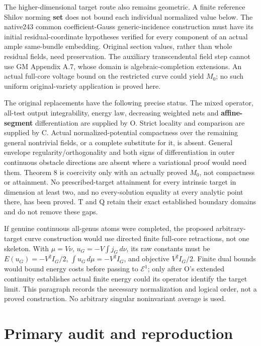 \documentclass[
  11pt,
]{article}
\begin{document}
The higher-dimensional target route also remains geometric. A finite
reference Shilov norming \textbf{set} does not bound each individual
normalized value below. The native243 common coefficient-Gauss
generic-incidence construction must have its initial residual-coordinate
hypotheses verified for every component of an actual ample same-bundle
embedding. Original section values, rather than whole residual fields,
need preservation. The auxiliary transcendental field step cannot use GM
Appendix A.7, whose domain is algebraic-completion extensions. An actual
full-core voltage bound on the restricted curve could yield \(M_0\); no
such uniform original-variety application is proved here.

The original replacements have the following precise status. The mixed
operator, all-test output integrability, energy law, decreasing weighted
nets and \textbf{affine-segment} differentiation are supplied by O.
Strict locality and comparison are supplied by C. Actual
normalized-potential compactness over the remaining general nontrivial
fields, or a complete substitute for it, is absent. General envelope
regularity/orthogonality and both signs of differentiation in outer
continuous obstacle directions are absent where a variational proof
would need them. Theorem 8 is coercivity only with an actually proved
\(M_0\), not compactness or attainment. No prescribed-target attainment
for every intrinsic target in dimension at least two, and no
every-solution equality at every analytic point there, has been proved.
T and Q retain their exact established boundary domains and do not
remove these gaps.

If genuine continuous all-genus atoms were completed, the proposed
arbitrary-target curve construction would use directed finite full-core
retractions, not one skeleton. With \(\mu=V\nu\),
\(u_G=-V\int j_G\,d\nu\), its raw constants must be
\(E(u_G)=-V^2I_G/2\), \(\int u_G\,d\mu=-V^2I_G\), and objective
\(V^2I_G/2\). Finite dual bounds would bound energy costs before passing
to \(\mathcal E^1\); only after O's extended continuity establishes
actual finite energy could its operator identify the target limit. This
paragraph records the necessary normalization and logical order, not a
proved construction. No arbitrary singular noninvariant average is used.

\section{Primary audit and
reproduction}\label{primary-audit-and-reproduction}
\end{document}
